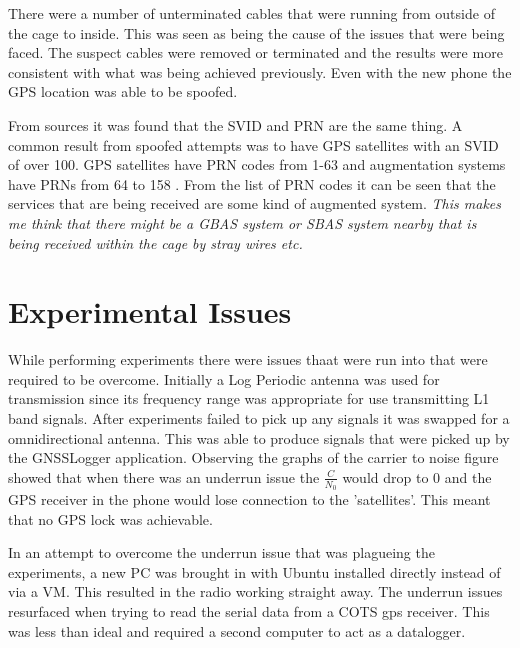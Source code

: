 There were a number of unterminated cables that were running from outside of the cage to inside. This was seen as being the cause of the issues that were being faced. The
suspect cables were removed or terminated and the results were more consistent with what was being achieved previously. Even with the new phone the GPS location was able
to be spoofed.

From sources  it was found that the SVID and PRN are the same thing. 
A common result from spoofed attempts was to have GPS satellites with an SVID of over 100. GPS satellites have PRN codes from 1-63 and augmentation systems have PRNs from
64 to 158 \cite{RN67}. From the list of PRN codes \cite{RN67} it can be seen that the services that are being received are some kind of augmented system. \emph{This makes
me think that there might be a GBAS system or SBAS system nearby that is being received within the cage by stray wires etc.}

\section{Experimental Issues}
While performing experiments there were issues thaat were run into that were required to be overcome. Initially a Log Periodic antenna was used for transmission since its
frequency range was appropriate for use transmitting L1 band signals. After experiments failed to pick up any signals it was swapped for a omnidirectional antenna. This
was able to produce signals that were picked up by the GNSSLogger application. Observing the graphs of the carrier to noise figure showed that when there was an underrun
issue the $\frac{C}{N_0}$ would drop to 0 and the GPS receiver in the phone would lose connection to the 'satellites'. This meant that no GPS lock was achievable.  

In an attempt to overcome the underrun issue that was plagueing the experiments, a new PC was brought in with Ubuntu installed directly instead of via a VM. This resulted
in the radio working straight away. The underrun issues resurfaced when trying to read the serial data from a COTS gps receiver. This was less than ideal and required a
second computer to act as a datalogger.
